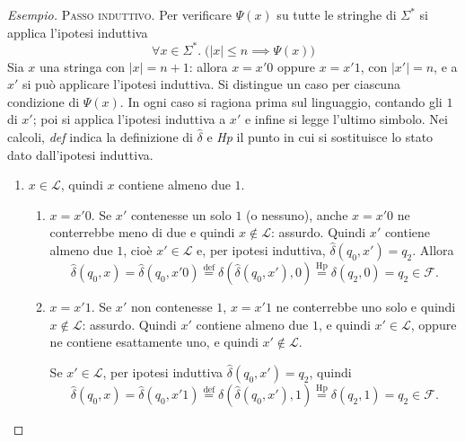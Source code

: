 \documentclass[a4paper, 11pt, oneside]{book}
\theoremstyle{formale}
\newenvironment{esempio}
    {\begin{proof}[\textit{Esempio}]\renewcommand{\qedsymbol}{$\diamond$}}
    {\end{proof}}
\begin{document}
\begin{esempio}
        \textsc{Passo induttivo}. Per verificare $\Psi(x)$ su tutte le stringhe di
        $\Sigma^*$ si applica l'ipotesi induttiva
        \begin{equation*}
            \forall x \in \Sigma^*.\; \bigl(|x| \leq n \implies \Psi(x)\bigr)
        \end{equation*}
        Sia $x$ una stringa
        con $|x| = n + 1$: allora $x = x'0$ oppure $x = x'1$, con $|x'| = n$, e a $x'$ si
        pu\`o applicare l'ipotesi induttiva. Si distingue un caso per ciascuna condizione
        di $\Psi(x)$. In ogni caso si ragiona prima sul linguaggio, contando gli $1$ di $x'$;
        poi si applica l'ipotesi induttiva a $x'$ e infine si legge l'ultimo simbolo. Nei
        calcoli, \emph{def} indica la definizione di $\hat{\delta}$ e \emph{Hp} il punto in
        cui si sostituisce lo stato dato dall'ipotesi induttiva.
        \begin{enumerate}
            \item $x \in \mathcal{L}$, quindi $x$ contiene almeno due $1$.
                \begin{enumerate}[label=\arabic{enumi}\alph*.]
                    \item $x = x'0$. Se $x'$ contenesse un solo $1$ (o nessuno), anche
                        $x = x'0$ ne conterrebbe meno di due e quindi $x \notin \mathcal{L}$:
                        assurdo. Quindi $x'$ contiene almeno due $1$, cio\`e
                        $x' \in \mathcal{L}$ e, per ipotesi induttiva,
                        $\hat{\delta}(q_0, x') = q_2$. Allora
                        \begin{equation*}
                            \hat{\delta}(q_0, x) = \hat{\delta}(q_0, x'0)
                            \overset{\text{def}}{=} \delta(\hat{\delta}(q_0, x'), 0)
                            \overset{\text{Hp}}{=} \delta(q_2, 0) = q_2 \in \mathcal{F}.
                        \end{equation*}
                    \item $x = x'1$. Se $x'$ non contenesse $1$, $x = x'1$ ne conterrebbe
                        uno solo e quindi $x \notin \mathcal{L}$: assurdo. Quindi $x'$ contiene
                        almeno due $1$, e quindi $x' \in \mathcal{L}$, oppure ne contiene
                        esattamente uno, e quindi $x' \notin \mathcal{L}$.

                        Se $x' \in \mathcal{L}$, per ipotesi induttiva
                        $\hat{\delta}(q_0, x') = q_2$, quindi
                        \begin{equation*}
                            \hat{\delta}(q_0, x) = \hat{\delta}(q_0, x'1)
                            \overset{\text{def}}{=} \delta(\hat{\delta}(q_0, x'), 1)
                            \overset{\text{Hp}}{=} \delta(q_2, 1) = q_2 \in \mathcal{F}.
                        \end{equation*}


\end{enumerate}
\end{enumerate}
\end{esempio}
\end{document}

